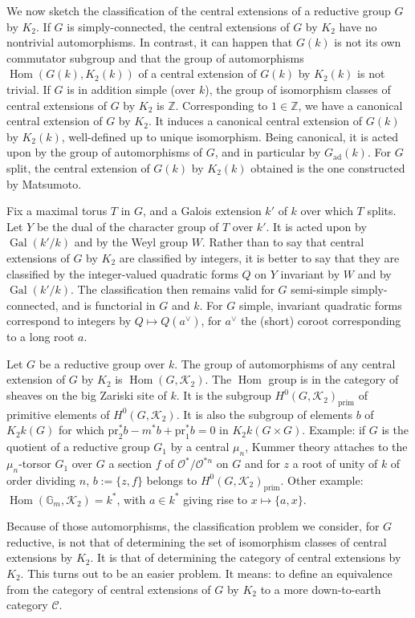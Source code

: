 \documentclass[11pt,a4paper]{article}
\theoremstyle{plain}
\theoremstyle{definition}
\DeclareMathOperator{\Hom}{Hom}
\DeclareMathOperator{\Gal}{Gal}
\newcommand{\cC}{\mathcal{C}}
\newcommand{\cK}{\mathcal{K}}
\newcommand{\cO}{\mathcal{O}}
\newcommand{\bZ}{\mathbb{Z}}
\newcommand{\Gm}{{\mathbb{G}_m}}
\newcommand{\ad}{\mathrm{ad}}
\newcommand{\pr}{\mathrm{pr}}
\begin{document}
We now sketch the classification of the central extensions of a reductive group $G$ by $K_2$. If $G$ is simply-connected, the central extensions of $G$ by $K_2$ have no nontrivial automorphisms. In contrast, it can happen that $G(k)$ is not its own commutator subgroup and that the group of automorphisms $\Hom(G(k), K_2(k))$ of a central extension of $G(k)$ by $K_2(k)$ is not trivial. If $G$ is in addition simple (over $k$), the group of isomorphism classes of central extensions of $G$ by $K_2$ is $\bZ$. Corresponding to $1 \in \bZ$, we have a canonical central extension of $G$ by $K_2$. It induces a canonical central extension of $G(k)$ by $K_2(k)$, well-defined up to unique isomorphism. Being canonical, it is acted upon by the group of automorphisms of $G$, and in particular by $G_{\ad}(k)$. For $G$ split, the central extension of $G(k)$ by $K_2(k)$ obtained is the one constructed by Matsumoto.

Fix a maximal torus $T$ in $G$, and a Galois extension $k'$ of $k$ over which $T$ splits. Let $Y$ be the dual of the character group of $T$ over $k'$. It is acted upon by $\Gal(k'/k)$ and by the Weyl group $W$. Rather than to say that central extensions of $G$ by $K_2$ are classified by integers, it is better to say that they are classified by the integer-valued quadratic forms $Q$ on $Y$ invariant by $W$ and by $\Gal(k'/k)$. The classification then remains valid for $G$ semi-simple simply-connected, and is functorial in $G$ and $k$. For $G$ simple, invariant quadratic forms correspond to integers by $Q \mapsto Q(a^\vee)$, for $a^\vee$ the (short) coroot corresponding to a long root $a$.

Let $G$ be a reductive group over $k$. The group of automorphisms of any central extension of $G$ by $K_2$ is $\Hom(G, \cK_2)$. The $\Hom$ group is in the category of sheaves on the big Zariski site of $k$. It is the subgroup $H^0(G, \cK_2)_{\mathrm{prim}}$ of primitive elements of $H^0(G, \cK_2)$. It is also the subgroup of elements $b$ of $K_2k(G)$ for which $\pr_2^*b - m^*b + \pr_1^*b = 0$ in $K_2k(G \times G)$. Example: if $G$ is the quotient of a reductive group $G_1$ by a central $\mu_n$, Kummer theory attaches to the $\mu_n$-torsor $G_1$ over $G$ a section $f$ of $\cO^*/\cO^{*n}$ on $G$ and for $z$ a root of unity of $k$ of order dividing $n$, $b := \{z, f\}$ belongs to $H^0(G, \cK_2)_{\mathrm{prim}}$. Other example: $\Hom(\Gm, \cK_2) = k^*$, with $a \in k^*$ giving rise to $x \mapsto \{a, x\}$.

Because of those automorphisms, the classification problem we consider, for $G$ reductive, is not that of determining the set of isomorphism classes of central extensions by $K_2$. It is that of determining the category of central extensions by $K_2$. This turns out to be an easier problem. It means: to define an equivalence from the category of central extensions of $G$ by $K_2$ to a more down-to-earth category $\cC$.
\end{document}
